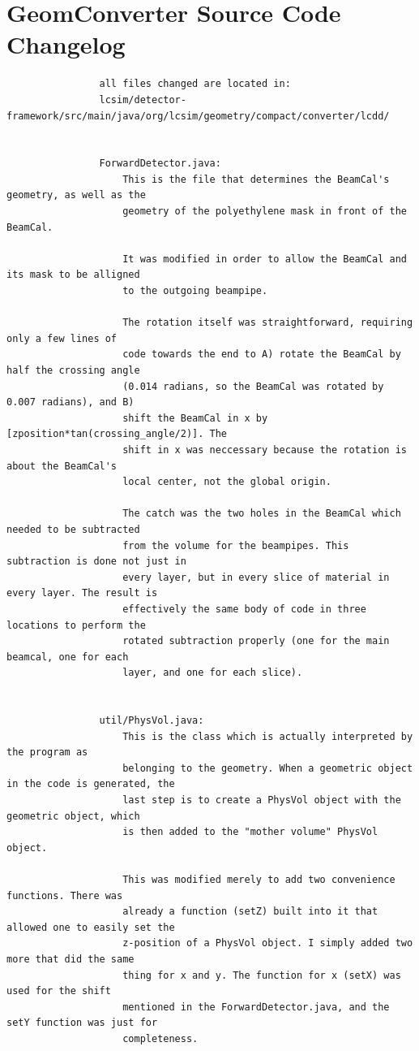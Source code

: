\documentclass{report}
\begin{document}
        \section{GeomConverter Source Code Changelog} \label{sect:geom_changes}
            \begin{verbatim}
                all files changed are located in:
                lcsim/detector-framework/src/main/java/org/lcsim/geometry/compact/converter/lcdd/


                ForwardDetector.java:
                    This is the file that determines the BeamCal's geometry, as well as the
                    geometry of the polyethylene mask in front of the BeamCal.
                    
                    It was modified in order to allow the BeamCal and its mask to be alligned
                    to the outgoing beampipe.
                    
                    The rotation itself was straightforward, requiring only a few lines of
                    code towards the end to A) rotate the BeamCal by half the crossing angle
                    (0.014 radians, so the BeamCal was rotated by 0.007 radians), and B) 
                    shift the BeamCal in x by [zposition*tan(crossing_angle/2)]. The
                    shift in x was neccessary because the rotation is about the BeamCal's
                    local center, not the global origin. 

                    The catch was the two holes in the BeamCal which needed to be subtracted
                    from the volume for the beampipes. This subtraction is done not just in
                    every layer, but in every slice of material in every layer. The result is
                    effectively the same body of code in three locations to perform the
                    rotated subtraction properly (one for the main beamcal, one for each
                    layer, and one for each slice). 


                util/PhysVol.java:
                    This is the class which is actually interpreted by the program as
                    belonging to the geometry. When a geometric object in the code is generated, the
                    last step is to create a PhysVol object with the geometric object, which
                    is then added to the "mother volume" PhysVol object.

                    This was modified merely to add two convenience functions. There was
                    already a function (setZ) built into it that allowed one to easily set the
                    z-position of a PhysVol object. I simply added two more that did the same
                    thing for x and y. The function for x (setX) was used for the shift
                    mentioned in the ForwardDetector.java, and the setY function was just for
                    completeness.



\end{verbatim}
\end{document}
